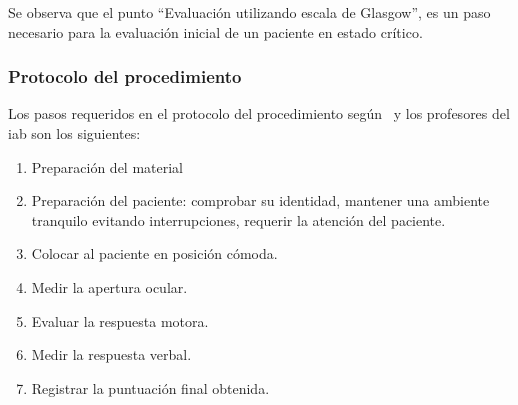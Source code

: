 Se observa que el punto \enquote{Evaluación utilizando escala de Glasgow}, es un
paso necesario para la evaluación inicial de un paciente en estado crítico.

\subsubsection{Protocolo del procedimiento}
\label{sec:glasgow_protocolo}

Los pasos requeridos en el protocolo del procedimiento según~\cite{protocolo} y los 
profesores del \Gls{iab} son los siguientes:

\begin{enumerate}
\item Preparación del material
\item Preparación del paciente: comprobar su identidad, mantener una ambiente
    tranquilo evitando interrupciones, requerir la atención del paciente.
\item Colocar al paciente en posición cómoda.
\item Medir la apertura ocular.
\item Evaluar la respuesta motora.
\item Medir la respuesta verbal.
\item Registrar la puntuación final obtenida.
\end{enumerate}
